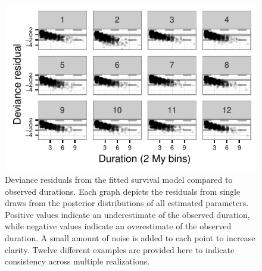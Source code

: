 \begin{figure}[ht]
  \centering
  \includegraphics[height = 0.5\textheight, width = \textwidth, keepaspectratio = true]{chapter_death_taxa/figure/residual_plot}
  \caption[Deviance residuals of fitted model]{Deviance residuals from the fitted survival model compared to observed durations. Each graph depicts the residuals from single draws from the posterior distributions of all estimated parameters. Positive values indicate an underestimate of the observed duration, while negative values indicate an overestimate of the observed duration. A small amount of noise is added to each point to increase clarity. Twelve different examples are provided here to indicate consistency across multiple realizations.}
  \label{fig:ppc_res}
\end{figure}


